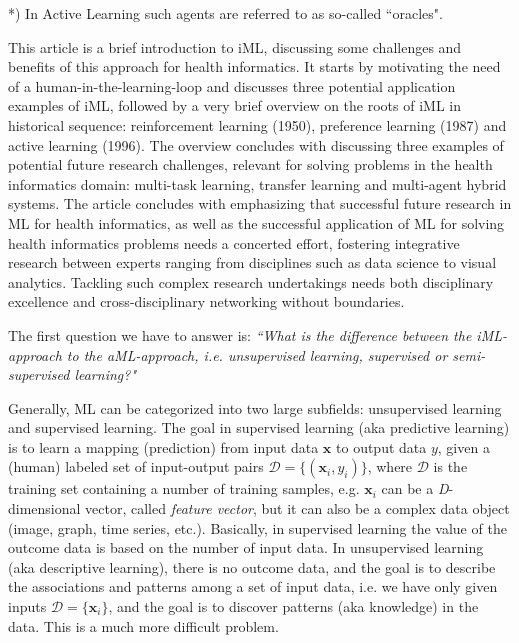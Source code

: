 *) In Active Learning such agents are referred to as so-called ``oracles".

This article is a brief introduction to iML, discussing some challenges and benefits of this approach for health informatics. It starts by motivating the need of a human-in-the-learning-loop and discusses three potential application examples of iML, followed by a very brief overview on the roots of iML in historical sequence: reinforcement learning (1950), preference learning (1987) and active learning (1996). The overview concludes with discussing three examples of potential future research challenges, relevant for solving problems in the health informatics domain: multi-task learning, transfer learning and multi-agent hybrid systems. The article concludes with emphasizing that successful future research in ML for health informatics, as well as the successful application of ML for solving health informatics problems needs a concerted effort, fostering integrative research between experts ranging from disciplines such as data science to visual analytics. Tackling such complex research undertakings needs both disciplinary excellence and cross-disciplinary networking without boundaries.

The first question we have to answer is: \textit{``What is the difference between the iML-approach to the aML-approach, i.e. unsupervised learning, supervised or semi-supervised learning?"}

Generally, ML can be categorized into two large subfields: unsupervised learning and supervised learning. The goal in supervised learning (aka predictive learning) is to learn a mapping (prediction) from input data $\textbf{x}$ to output data $y$, given a (human) labeled set of input-output pairs $\mathcal{D}=\{(\textbf{x}_{i},y_i)\}$, where $\mathcal{D}$ is the training set containing a number of training samples, e.g. $\textbf{x}_{i}$ can be a \textit{D}-dimensional vector, called \textit{feature vector}, but it can also be a complex data object (image, graph, time series, etc.). Basically, in supervised learning the value of the outcome data is based on the number of input data.
In unsupervised learning (aka descriptive learning), there is no outcome data, and the goal is to describe the associations and patterns among a set of input data, i.e. we have only given inputs $\mathcal{D}=\{\textbf{x}_{i}\}$, and the goal is to discover patterns (aka knowledge) in the data. This is a much more difficult problem.\\







